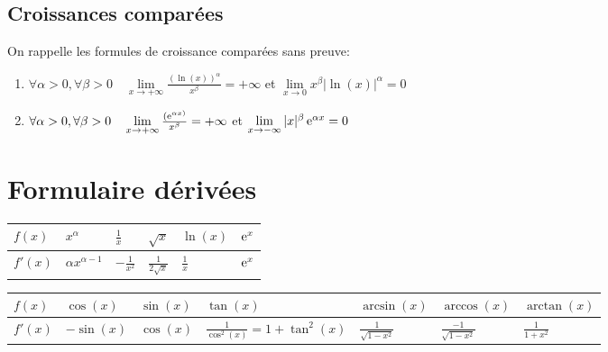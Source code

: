 \subsection{Croissances comparées}
On rappelle les formules de croissance comparées sans preuve:

\begin{enumerate}[label=(\alph*)]
\item $\forall \alpha>0, \forall \beta>0 \quad \lim \limits_{x \to +\infty}
  \frac{(\ln(x))^{\alpha}}{x^{\beta}} = +\infty$ \qquad et \qquad$\lim \limits_{x \to 0}
  x^{\beta} |\ln(x)|^{\alpha} = 0$
\item $\forall \alpha>0, \forall \beta>0 \quad \lim \limits_{x \to +\infty}
  \frac{(\operatorname{e}^{\alpha x)}}{x^{\beta}} = +\infty$ \qquad et \qquad $\lim \limits_{x \to -\infty}
   |x|^{\beta} \operatorname{e}^{\alpha x} = 0$  
\end{enumerate}

\newpage
\appendix
\section{Formulaire dérivées}
\begin{center}
  \renewcommand{\arraystretch}{3} %
  \begin{tabular}{|l|C{1cm}|C{1cm}|C{1cm}|C{1cm}|C{1cm}|}
    \hline
    $f(x)$ & $x^{\alpha}$ & $\frac{1}{x}$ & $\sqrt{x}$ & $\ln(x)$ & $\operatorname{e}^x$\\
    \hline
    $f'(x)$ & $\alpha x^{\alpha-1}$ & $-\frac{1}{x^2}$ & $\frac{1}{2\sqrt{x}}$ 
            & $\frac{1}{x}$ & $\operatorname{e}^x$\\
    \hline
  \end{tabular}
\end{center}

\tiny
\begin{center}
  \renewcommand{\arraystretch}{2} %
  \begin{tabular}{|l|C{1cm}|C{1cm}|C{2.5cm}|C{1cm}|C{1cm}|C{1cm}|}
    \hline
    $f(x)$ & $\cos(x)$ & $\sin(x)$ & $\tan(x)$ & $\arcsin(x)$ & $\arccos(x)$ & $\arctan(x)$\\
    \hline
    $f'(x)$ & $-\sin(x)$ & $\cos(x)$ & $\frac{1}{\cos^2(x)}=1+\tan^2(x)$ 
            & $\frac{1}{\sqrt{1-x^2}}$ & $\frac{-1}{\sqrt{1-x^2}}$ & $\frac{1}{1+x^2}$\\
    \hline
  \end{tabular}
\end{center}


